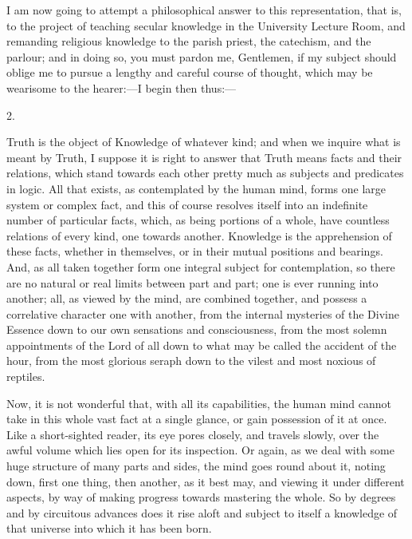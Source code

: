 I am now going to attempt a philosophical answer to this
representation, that is, to the project of teaching secular knowledge
in the University Lecture Room, and remanding religious knowledge to
the parish priest, the catechism, and the parlour; and in doing so,
you must pardon me, Gentlemen, if my subject should oblige me to
pursue a lengthy and careful course of thought, which may be wearisome
to the hearer:—I begin then thus:—

2.

Truth is the object of Knowledge of whatever kind; and when we
inquire what is meant by Truth, I suppose it is right to answer that
Truth means facts and their relations, which stand towards each other
pretty much as subjects and predicates in logic. All that exists, as
contemplated by the human mind, forms one large system or complex
fact, and this of course resolves itself into an indefinite number of
particular facts, which, as being portions of a whole, have countless
relations of every kind, one towards another. Knowledge is the
apprehension of these facts, whether in themselves, or in their mutual
positions and bearings. And, as all taken together form one integral
subject for contemplation, so there are no natural or real limits
between part and part; one is ever running into another; all, as
viewed by the mind, are combined together, and possess a correlative
character one with another, from the internal mysteries of the Divine
Essence down to our own sensations and consciousness, from the most
solemn appointments of the Lord of all down to what may be called the
accident of the hour, from the most glorious seraph down to the vilest
and most noxious of reptiles.

Now, it is not wonderful that, with all its capabilities, the human
mind cannot take in this whole vast fact at a single glance, or gain
possession of it at once. Like a short-sighted reader, its eye pores
closely, and travels slowly, over the awful volume which lies open for
its inspection. Or again, as we deal with some huge structure of many
parts and sides, the mind goes round about it, noting down, first one
thing, then another, as it best may, and viewing it under different
aspects, by way of making progress towards mastering the whole. So by
degrees and by circuitous advances does it rise aloft and subject
to itself a knowledge of that universe into which it has been born.

